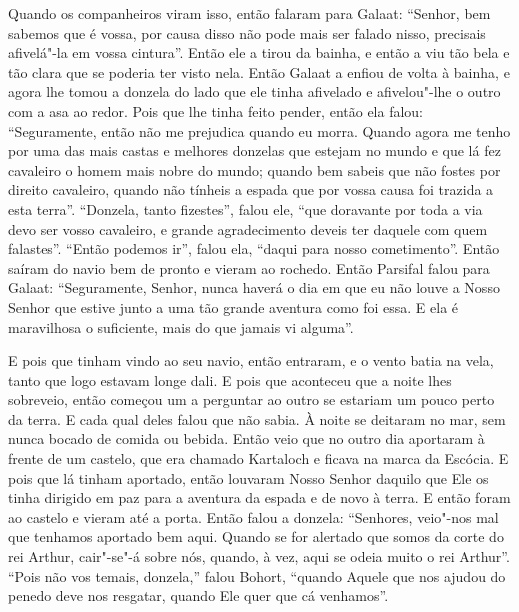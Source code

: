 Quando os companheiros viram isso, então falaram para Galaat: “Senhor, bem
sabemos que é vossa, por causa disso não pode mais ser falado nisso, precisais
afivelá"-la em vossa cintura”. Então ele a tirou da bainha, e então a viu tão
bela e tão clara que se poderia ter visto nela. Então Galaat a enfiou de volta
à bainha, e agora lhe tomou a donzela do lado que ele tinha afivelado e
afivelou"-lhe o outro com a asa ao redor. Pois que lhe tinha feito pender, então
ela falou: “Seguramente, então não me prejudica quando eu morra. Quando agora
me tenho por uma das mais castas e melhores donzelas que estejam no mundo e que
lá fez cavaleiro o homem mais nobre do mundo; quando bem sabeis que não fostes
por direito cavaleiro, quando não tínheis a espada que por vossa causa foi
trazida a esta terra”. “Donzela, tanto fizestes”, falou ele, “que doravante por
toda a via devo ser vosso cavaleiro, e grande agradecimento deveis ter daquele
com quem falastes”. “Então podemos ir”, falou ela, “daqui para nosso
cometimento”. Então saíram do navio bem de pronto e vieram ao rochedo. Então
Parsifal falou para Galaat: “Seguramente, Senhor, nunca haverá o dia em que eu
não louve a Nosso Senhor que estive junto a uma tão grande aventura como foi
essa. E ela é maravilhosa o suficiente, mais do que jamais vi alguma”.

E pois que tinham vindo ao seu navio, então entraram, e o vento batia na vela,
tanto que logo estavam longe dali. E pois que aconteceu que a noite lhes
sobreveio, então começou um a perguntar ao outro se estariam um pouco perto da
terra. E cada qual deles falou que não sabia. À noite se deitaram no mar, sem
nunca bocado de comida ou bebida. Então veio que no outro dia aportaram à
frente de um castelo, que era chamado Kartaloch e ficava na marca da Escócia. E
pois que lá tinham aportado,  então louvaram Nosso Senhor daquilo que Ele os
tinha dirigido em paz para a aventura da espada e de novo à terra. E então
foram ao castelo e vieram até a porta. Então falou a donzela: “Senhores,
veio"-nos mal que tenhamos aportado bem aqui. Quando se for alertado que somos
da corte do rei Arthur, cair"-se"-á sobre nós, quando, à vez, aqui se odeia muito
o rei Arthur”. “Pois não vos temais, donzela,” falou Bohort, “quando Aquele que
nos ajudou do penedo deve nos resgatar, quando Ele quer que cá venhamos”.

